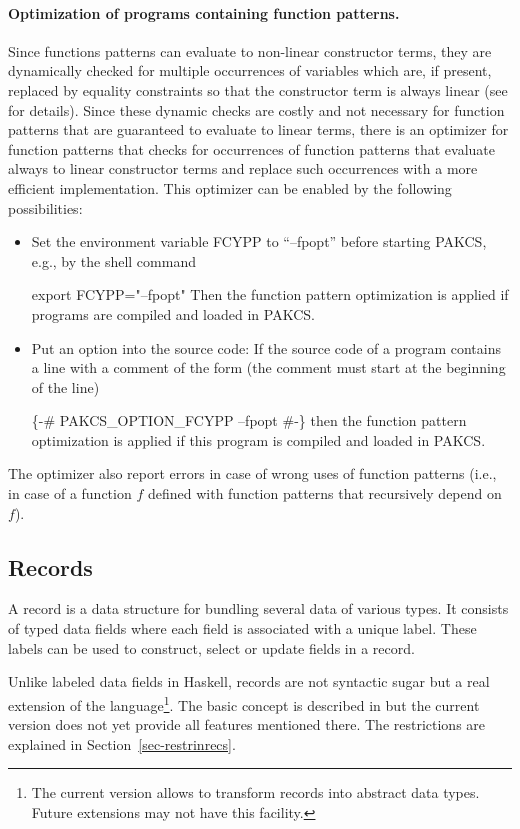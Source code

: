 \documentclass[11pt,fleqn]{article}
\makeatletter
\renewcommand{\tt}{\usefont{OT1}{cmtt}{m}{n}\selectfont}
\newcommand{\codefont}{\tt}
\newenvironment{prog}{\par\vspace{0.7ex}
\setlength{\parindent}{1.0cm}
\setlength{\parskip}{-0.1ex}
\obeylines\@vobeyspaces\tt}{\vspace{0.7ex}\noindent
}
\newcommand{\startprog}{\begin{prog}}
\newcommand{\stopprog}{\end{prog}\noindent}
\newcommand{\code}[1]{\mbox{\codefont #1}}
\newcommand{\ccode}[1]{``\mbox{\codefont #1}''}
\makeatother
\begin{document}
\paragraph{Optimization of programs containing function patterns.}
Since functions patterns can evaluate to non-linear constructor terms,
they are dynamically checked for multiple occurrences of
variables which are, if present, replaced by equality constraints
so that the constructor term is always linear
(see \cite{AntoyHanus05LOPSTR} for details).
Since these dynamic checks are costly and not necessary for
function patterns that are guaranteed to evaluate to linear terms,
there is an optimizer for function patterns that checks
for occurrences of function patterns that evaluate always to
linear constructor terms and replace such occurrences
with a more efficient implementation.
This optimizer can be enabled by the following possibilities:
\begin{itemize}
\item
Set the environment variable \code{FCYPP} to \ccode{--fpopt}
before starting PAKCS, e.g., by the shell command
\startprog
export FCYPP="--fpopt"
\stopprog
Then the function pattern optimization is applied if programs are compiled
and loaded in PAKCS.
\item
Put an option into the source code:
If the source code of a program
contains a line with a comment of the form (the comment
must start at the beginning of the line)
\startprog
\{-\# PAKCS_OPTION_FCYPP --fpopt \#-\}
\stopprog
then the function pattern optimization is applied
if this program is compiled and loaded in PAKCS.
\end{itemize}
The optimizer also report errors in case of wrong uses of function patterns
(i.e., in case of a function $f$ defined with function patterns that
recursively depend on $f$).


\subsection {Records}
\label{records}

A record is a data structure for bundling several data of various types.
It consists of typed data fields where each field is associated with
a unique label. These labels can be used to construct, select or update
fields in a record.


Unlike labeled data fields in Haskell, records are 
not syntactic sugar but a real extension of the
language\footnote{The current version allows to transform records
  into abstract data types. Future extensions may not have
  this facility.}.
The basic concept is described in \cite{Leijen05} but the current
version does not yet provide all features mentioned there. 
The restrictions are explained in Section~\ref{sec-restrinrecs}.
 
\end{document}
